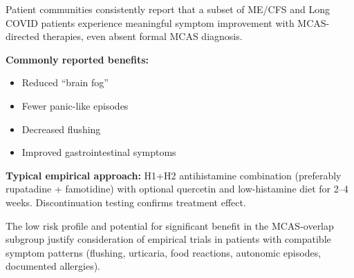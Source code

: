 \begin{observation}
Patient communities consistently report that a subset of ME/CFS and Long COVID patients experience meaningful symptom improvement with MCAS-directed therapies, even absent formal MCAS diagnosis.

\textbf{Commonly reported benefits:}
\begin{itemize}
    \item Reduced ``brain fog''
    \item Fewer panic-like episodes
    \item Decreased flushing
    \item Improved gastrointestinal symptoms
\end{itemize}

\textbf{Typical empirical approach:} H1+H2 antihistamine combination (preferably rupatadine + famotidine) with optional quercetin and low-histamine diet for 2--4 weeks. Discontinuation testing confirms treatment effect.

The low risk profile and potential for significant benefit in the MCAS-overlap subgroup justify consideration of empirical trials in patients with compatible symptom patterns (flushing, urticaria, food reactions, autonomic episodes, documented allergies).
\end{observation}

